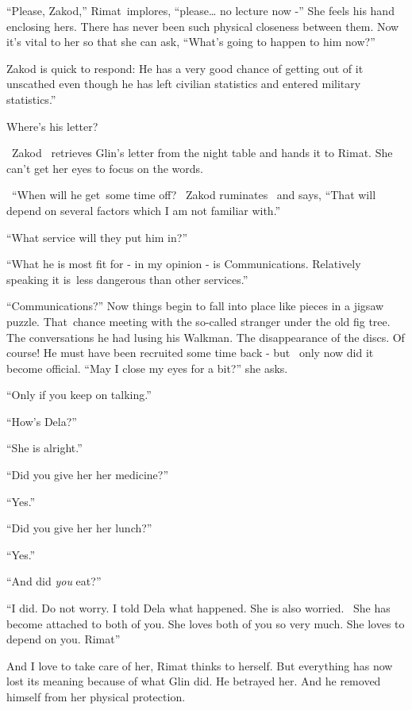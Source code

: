 \documentclass[letterpaper]{article}
\begin{document}
{}``Please, Zakod,'' Rimat~implores, ``please{\dots} no lecture now -'' She feels his hand enclosing hers. There has
never been such physical closeness\textcolor{red}{ }between them. Now it's vital to her so that she can ask, ``What's
going to happen to him now?'' 

Zakod is quick to respond: {\textquotedbl}He has a very good chance of getting out of it unscathed even though he has
left civilian statistics and entered military statistics.'' 

{\textquotedbl}Where's his letter?{\textquotedbl} 

~Zakod~ retrieves Glin's letter from the night table and hands it to Rimat. She can't get her eyes to focus on the
words. 

\ {}``When will he get~some time off?{\textquotedbl} \ Zakod ruminates \ and says, ``That will depend on several factors
which I am not familiar with.'' \ 

{}``What service will they put him in?''

{}``What he is most fit for - in my opinion - is Communications. Relatively speaking it is~less dangerous than other
services.''

{}``Communications?'' Now things begin to fall into place like pieces in a jigsaw puzzle. That~chance meeting with the
so-called stranger under the old fig tree. The conversations he had lusing his Walkman. The disappearance of the discs.
Of course! He must have been recruited some time back - but \ only now did it become official. ``May I close my eyes
for a bit?'' she asks. 

{}``Only if you keep on talking.'' 

{}``How's Dela?'' 

{}``She is alright.'' 

{}``Did you give her her medicine?'' 

{}``Yes.'' 

{}``Did you give her\textcolor{red}{ }her lunch?'' 

{}``Yes.'' 

{}``And did \textit{you} eat?'' 

{}``I did. Do not worry. I told Dela what happened. She is also worried.~ She has become attached to both of you. She
loves both of you so very much. She loves to depend on you. Rimat''

And I love to take care of her, Rimat thinks to herself. But everything has now lost its meaning because of what Glin
did. He betrayed her. And he removed himself from her physical protection.
\end{document}
